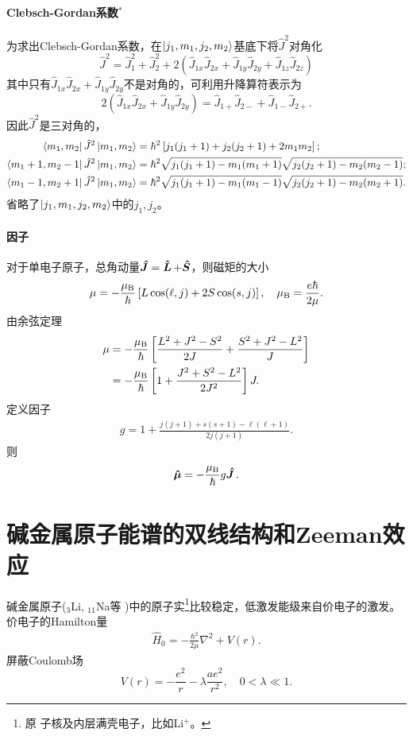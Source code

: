 \paragraph{Clebsch-Gordan系数$^\ast$}为求出Clebsch-Gordan系数，在$\left\vert j_1,m_1,j_2,m_2\right\rangle$基底下将$\hat J^2$对角化
\[
	\hat J^2=\hat J_1^2+\hat J_2^2+2(\hat J_{1x}\hat J_{2x}+\hat J_{1y}\hat J_{2y}+\hat J_{1z}\hat J_{2z})
\]
其中只有$\hat J_{1x}\hat J_{2x}+\hat J_{1y}\hat J_{2y}$不是对角的，可利用升降算符表示为
\[
2(\hat J_{1x}\hat J_{2x}+\hat J_{1y}\hat J_{2y})=\hat J_{1+}\hat J_{2-}+\hat J_{1-}\hat J_{2+}.
\]
因此$\hat J^2$是三对角的，
{\footnotesize
\begin{align*}
	\left\langle m_1,m_2\right\vert\hat J^2\left\vert m_1,m_2\right\rangle&=\hbar^2\left[j_1(j_1+1)+j_2(j_2+1)+2m_1m_2\right];\\
	\left\langle m_1+1,m_2-1\right\vert\hat J^2\left\vert m_1,m_2\right\rangle&=\hbar^2\sqrt{j_1(j_1+1)-m_1(m_1+1)}\sqrt{j_2(j_2+1)-m_2(m_2-1)};\\
	\left\langle m_1-1,m_2+1\right\vert\hat J^2\left\vert m_1,m_2\right\rangle&=\hbar^2\sqrt{j_1(j_1+1)-m_1(m_1-1)}\sqrt{j_2(j_2+1)-m_2(m_2+1)}.
\end{align*}
}
省略了$\left\vert j_1,m_1,j_2,m_2\right\rangle$中的$j_1,j_2$。
\paragraph{\Lande 因子}对于单电子原子，总角动量$\bm{\hat J}\!\mathop{}=\bm{\hat L}\!\mathop{}+\bm{\hat S}\!\mathop{}$，则磁矩的大小
\[
	\mu=-\frac{\mu_\mathrm B}\hbar\left[L\cos(\ell,j)+2S\cos(s,j)\right],\quad\mu_\mathrm B=\frac{e\hbar}{2\mu}.
\]
由余弦定理
\begin{align*}
	\mu&=-\frac{\mu_\mathrm B}\hbar\left[\frac{L^2+J^2-S^2}{2J}+\frac{S^2+J^2-L^2}J\right]\\
	&=-\frac{\mu_\mathrm B}\hbar\left[1+\frac{J^2+S^2-L^2}{2J^2}\right]J.
\end{align*}
定义\Lande 因子 
\begin{align}
	g=1+\frac{j(j+1)+s(s+1)-\ell(\ell+1)}{2j(j+1)}.
\end{align}
则
\[
	\bm{\hat \mu}\!\mathop{}=-\frac{\mu_\mathrm B}\hbar g\bm{\hat J}\!\mathop{}.
\]

\section{碱金属原子能谱的双线结构和Zeeman效应}
碱金属原子($_3$Li, $_{11}$Na等%
)中的原子实\footnote{原
子核及内层满壳电子，比如Li$^+$。}比较稳定，低激发能级来自价电子的激发。价电子的Hamilton量
\begin{align}
	\hat H_0=-\frac{\hbar^2}{2\mu}\nabla^2+V(r).
\end{align}
屏蔽Coulomb场
\[
V(r)=-\frac{e^2}r-\lambda\frac{ae^2}{r^2},\quad 0<\lambda\ll 1.
\]

